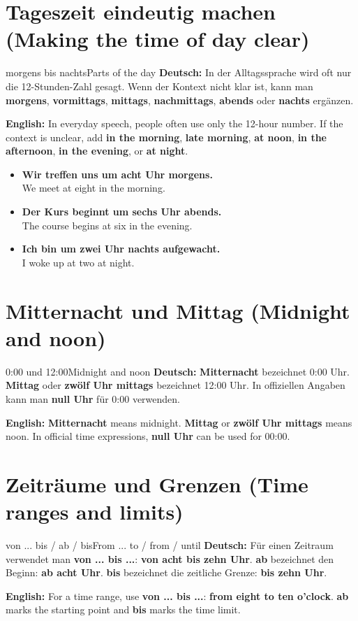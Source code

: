 \documentclass[a4paper,11pt]{article}
\newcommand{\GermanText}[1]{\textbf{Deutsch: }#1\par}
\newcommand{\EnglishText}[1]{{\small\color{SoftGray}\textbf{English: }#1\par}}
\newcommand{\ExampleItem}[2]{\item \textbf{#1}\\{\small\color{SoftGray}#2}}
\begin{document}
\section{Tageszeit eindeutig machen \textnormal{(Making the time of day clear)}}
\begin{grammarentry}{morgens bis nachts}{Parts of the day}
\GermanText{In der Alltagssprache wird oft nur die 12-Stunden-Zahl gesagt. Wenn der Kontext nicht klar ist, kann man \textbf{morgens}, \textbf{vormittags}, \textbf{mittags}, \textbf{nachmittags}, \textbf{abends} oder \textbf{nachts} ergänzen.}
\EnglishText{In everyday speech, people often use only the 12-hour number. If the context is unclear, add \textbf{in the morning}, \textbf{late morning}, \textbf{at noon}, \textbf{in the afternoon}, \textbf{in the evening}, or \textbf{at night}.}
\end{grammarentry}
\begin{exbox}\begin{itemize}
\ExampleItem{Wir treffen uns um acht Uhr morgens.}{We meet at eight in the morning.}
\ExampleItem{Der Kurs beginnt um sechs Uhr abends.}{The course begins at six in the evening.}
\ExampleItem{Ich bin um zwei Uhr nachts aufgewacht.}{I woke up at two at night.}
\end{itemize}\end{exbox}
\section{Mitternacht und Mittag \textnormal{(Midnight and noon)}}
\begin{grammarentry}{0:00 und 12:00}{Midnight and noon}
\GermanText{\textbf{Mitternacht} bezeichnet 0:00 Uhr. \textbf{Mittag} oder \textbf{zwölf Uhr mittags} bezeichnet 12:00 Uhr. In offiziellen Angaben kann man \textbf{null Uhr} für 0:00 verwenden.}
\EnglishText{\textbf{Mitternacht} means midnight. \textbf{Mittag} or \textbf{zwölf Uhr mittags} means noon. In official time expressions, \textbf{null Uhr} can be used for 00:00.}
\end{grammarentry}
\section{Zeiträume und Grenzen \textnormal{(Time ranges and limits)}}
\begin{grammarentry}{von ... bis / ab / bis}{From ... to / from / until}
\GermanText{Für einen Zeitraum verwendet man \textbf{von ... bis ...}: \textbf{von acht bis zehn Uhr}. \textbf{ab} bezeichnet den Beginn: \textbf{ab acht Uhr}. \textbf{bis} bezeichnet die zeitliche Grenze: \textbf{bis zehn Uhr}.}
\EnglishText{For a time range, use \textbf{von ... bis ...}: \textbf{from eight to ten o'clock}. \textbf{ab} marks the starting point and \textbf{bis} marks the time limit.}
\end{grammarentry}
\end{document}
